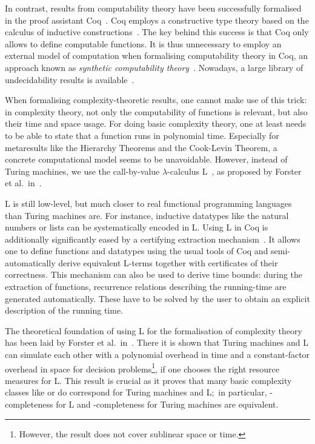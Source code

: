 In contrast, results from computability theory have been successfully formalised in the proof assistant Coq~\cite{coqweb}. 
Coq employs a constructive type theory based on the calculus of inductive constructions~\cite{iclnotes}. The key behind this success is that Coq only allows to define computable functions. 
It is thus unnecessary to employ an external model of computation when formalising computability theory in Coq, an approach known as \textit{synthetic computability theory}~\cite{ForsterEtAl:2018:On-Synthetic-Undecidability}. 
Nowadays, a large library of undecidability results is available~\cite{coq_undec}. 

When formalising complexity-theoretic results, one cannot make use of this trick: in complexity theory, not only the computability of functions is relevant, but also their time and space usage. For doing basic complexity theory, one at least needs to be able to state that a function runs in polynomial time.
Especially for metaresults like the Hierarchy Theorems and the Cook-Levin Theorem, a concrete computational model seems to be unavoidable.
However, instead of Turing machines, we use the call-by-value $\lambda$-calculus L~\cite{ForsterSmolka:2017:L-Computability}, as proposed by Forster et al.\ in~\cite{ForsterEtAl:2019:VerifiedTMs}. 

L is still low-level, but much closer to real functional programming languages than Turing machines are. For instance, inductive datatypes like the natural numbers or lists can be systematically encoded in L.
Using L in Coq is additionally significantly eased by a certifying extraction mechanism~\cite{ForsterKunze:2019:Certifying-extraction}. It allows one to define functions and datatypes using the usual tools of Coq and semi-automatically derive equivalent L-terms together with certificates of their correctness. 
This mechanism can also be used to derive time bounds: during the extraction of functions, recurrence relations describing the running-time are generated automatically. These have to be solved by the user to obtain an explicit description of the running time. 

The theoretical foundation of using L for the formalisation of complexity theory has been laid by Forster et al.\ in~\cite{ForsterKunzeRoth:2019:wcbv-Reasonable}. There it is shown that Turing machines and L can simulate each other with a polynomial overhead in time and a constant-factor overhead in space for decision problems\footnote{However, the result does not cover sublinear space or time.}, if one chooses the right resource measures for L.
This result is crucial as it proves that many basic complexity classes like \NP{} or \PC{} do correspond for Turing machines and L;\ in particular, \NP{}-completeness for L and \NP{}-completeness for Turing machines are equivalent.

